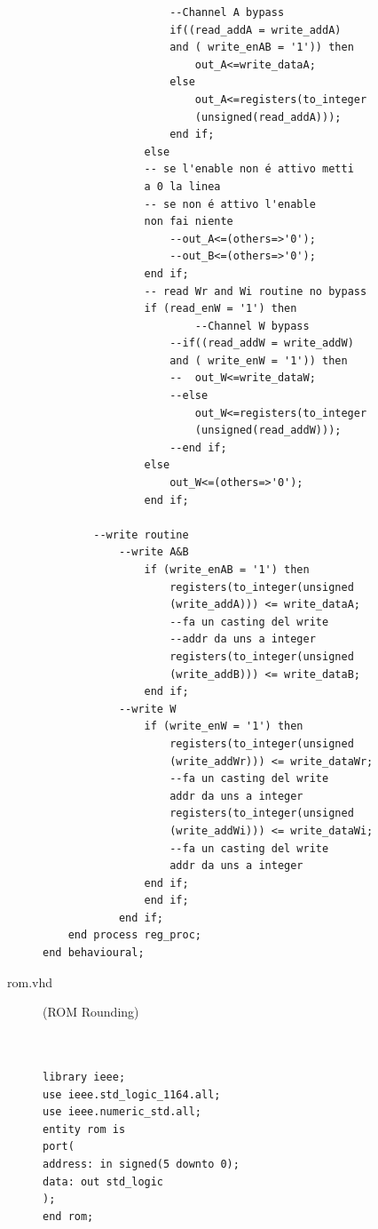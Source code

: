 \documentclass[a4paper, titlepage]{article}
\begin{document}
\begin{description}
\begin{verbatim}
					--Channel A bypass
					if((read_addA = write_addA) 
					and ( write_enAB = '1')) then
						out_A<=write_dataA;
					else
						out_A<=registers(to_integer
						(unsigned(read_addA)));
					end if;
				else
				-- se l'enable non é attivo metti 
				a 0 la linea 
				-- se non é attivo l'enable 
				non fai niente
					--out_A<=(others=>'0');
					--out_B<=(others=>'0');
				end if;
		    	-- read Wr and Wi routine no bypass	
				if (read_enW = '1') then
						--Channel W bypass
					--if((read_addW = write_addW) 
					and ( write_enW = '1')) then
					--	out_W<=write_dataW;
					--else
						out_W<=registers(to_integer
						(unsigned(read_addW)));
					--end if;
				else
					out_W<=(others=>'0');
				end if;
						
		--write routine 
			--write A&B
				if (write_enAB = '1') then
					registers(to_integer(unsigned
					(write_addA))) <= write_dataA; 
					--fa un casting del write 
					--addr da uns a integer
					registers(to_integer(unsigned
					(write_addB))) <= write_dataB;
				end if;
			--write W
				if (write_enW = '1') then
					registers(to_integer(unsigned
					(write_addWr))) <= write_dataWr;
					--fa un casting del write 
					addr da uns a integer
					registers(to_integer(unsigned
					(write_addWi))) <= write_dataWi;
					--fa un casting del write 
					addr da uns a integer
				end if;
				end if;
			end if;
	end process reg_proc;
end behavioural;

\end{verbatim}
\item [rom.vhd] (ROM Rounding)
\begin{verbatim}


library ieee;
use ieee.std_logic_1164.all; 
use ieee.numeric_std.all;
entity rom is
port(
address: in signed(5 downto 0);
data: out std_logic
);
end rom;


\end{verbatim}
\end{description}
\end{document}
